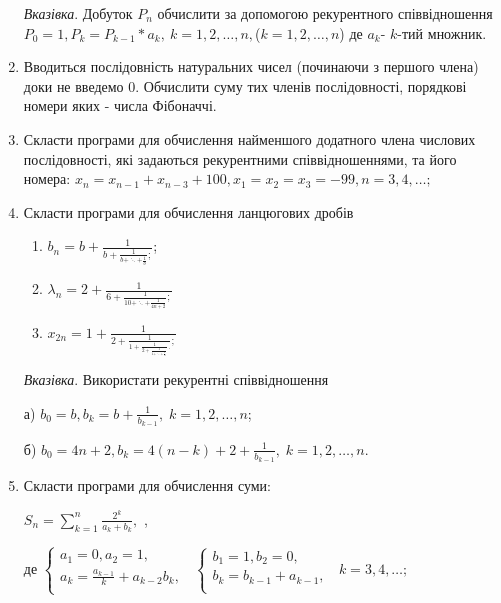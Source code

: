 \documentclass[]{article}
\makeatletter
\newcommand{\xslalph}[1]{\expandafter\@xslalph\csname c@#1\endcsname}
\newcommand{\@xslalph}[1]{%
    \ifcase#1\or а\or б\or в\or г\or д\or e\or є\or ж\or з\or i%
    \or й\or к\or л\or м\or н\or о\or п\or р\or с\or т%
    \or у\or ф\or х\or ц\or ч\or ш\or ю\or я\or аа\or бб\or вв %
    \else\@ctrerr\fi%
}
\makeatother
\begin{document}
\begin{enumerate}
\begin{enumerate}[label=\xslalph*)]
\end{enumerate}

\emph{\emph{Вказівка}}. Добуток $P_{n}$ обчислити за
допомогою рекурентного співвідношення
\(P_{0} = 1,P_{k} = P_{k - 1}*a_{k},\ k = 1,2,\ldots,n,\)($k=1,2,\ldots,n$)
де \(a_{k}\)- $k$-тий множник.

\item
Вводиться послідовність натуральних чисел (починаючи з першого члена)
доки не введемо 0. Обчислити суму тих членів послідовності, порядкові
номери яких - числа Фібоначчі.

\item
  Скласти програми для обчислення найменшого додатного члена числових
  послідовності, які задаються рекурентними співвідношеннями, та його
  номера:
\(x_{n} = x_{n - 1} + x_{n - 3} + 100, x_{1} = x_{2} = x_{3} = - 99, n = 3,4,\ldots;\)

\item
  Скласти програми для обчислення ланцюгових дробів
\begin{enumerate}[label=\xslalph*)]
\item \(b_{n} = b + \frac{1}{b + \frac{1}{b + \ddots + \frac{1}{b}};}\); 
\item
\(\lambda_{n} = 2 + \frac{1}{6 + \frac{1}{10 + \ddots + \frac{1}{4n + 2}};}\)
\item
\(x_{2n} = 1 + \frac{1}{2 + \frac{1}{1 + \frac{1}{2 + \frac{1}{1 + \ddots + \frac{1}{2}}}.};}\)
\end{enumerate}
\emph{\emph{Вказівка}}. Використати рекурентні співвідношення

а)
\(b_{0} = b,b_{k} = b + \frac{1}{b_{k - 1}}, \; k = 1,2,\ldots,n\);

б)
\(b_{0} = 4n + 2,b_{k} = 4(n - k) + 2 + \frac{1}{b_{k - 1}},\; k = 1,2,\ldots,n\).

\item
  Скласти програми для обчислення суми:


\(S_{n} = \sum\limits_{k = 1}^{n}\frac{2^{k}}{a_{k} + b_{k}},\) ,

де \(\left\{ \begin{matrix}
 a_{1} = 0,a_{2} = 1, \\
 a_{k} = \frac{a_{k - 1}}{k} + a_{k - 2}b_{k}, \\
\end{matrix} \right.\ \) \(\left\{ \begin{matrix}
 b_{1} = 1,b_{2} = 0, \\
 b_{k} = b_{k - 1} + a_{k - 1}, \\
\end{matrix} \right.\ \) \(k = 3,4,\ldots;\)



\end{enumerate}
\end{document}
